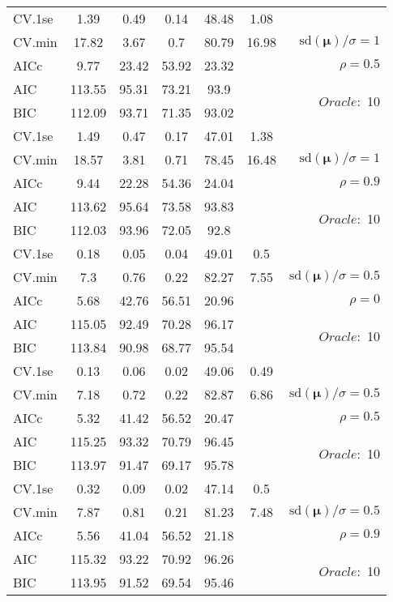 \begin{table}
\begin{center}
\begin{tabular}{l*{5}{c}|r}
 \hline 
CV.1se & 1.39 & 0.49 & 0.14 & 48.48 & 1.08 & \\
CV.min & 17.82 & 3.67 & 0.7 & 80.79 & 16.98 &  $\mathrm{sd}(\mathbf{\mu})/\sigma=1$ \\
AICc & 9.77 & 23.42 & 53.92 & 23.32 & & $\rho=0.5$ \\
AIC & 113.55 & 95.31 & 73.21 & 93.9 & &  \multirow{2}{*}{$Oracle: $ 10} \\
BIC & 112.09 & 93.71 & 71.35 & 93.02 & &  \\
 \hline 
CV.1se & 1.49 & 0.47 & 0.17 & 47.01 & 1.38 & \\
CV.min & 18.57 & 3.81 & 0.71 & 78.45 & 16.48 &  $\mathrm{sd}(\mathbf{\mu})/\sigma=1$ \\
AICc & 9.44 & 22.28 & 54.36 & 24.04 & & $\rho=0.9$ \\
AIC & 113.62 & 95.64 & 73.58 & 93.83 & &  \multirow{2}{*}{$Oracle: $ 10} \\
BIC & 112.03 & 93.96 & 72.05 & 92.8 & &  \\
 \hline 
CV.1se & 0.18 & 0.05 & 0.04 & 49.01 & 0.5 & \\
CV.min & 7.3 & 0.76 & 0.22 & 82.27 & 7.55 &  $\mathrm{sd}(\mathbf{\mu})/\sigma=0.5$ \\
AICc & 5.68 & 42.76 & 56.51 & 20.96 & & $\rho=0$ \\
AIC & 115.05 & 92.49 & 70.28 & 96.17 & &  \multirow{2}{*}{$Oracle: $ 10} \\
BIC & 113.84 & 90.98 & 68.77 & 95.54 & &  \\
 \hline 
CV.1se & 0.13 & 0.06 & 0.02 & 49.06 & 0.49 & \\
CV.min & 7.18 & 0.72 & 0.22 & 82.87 & 6.86 &  $\mathrm{sd}(\mathbf{\mu})/\sigma=0.5$ \\
AICc & 5.32 & 41.42 & 56.52 & 20.47 & & $\rho=0.5$ \\
AIC & 115.25 & 93.32 & 70.79 & 96.45 & &  \multirow{2}{*}{$Oracle: $ 10} \\
BIC & 113.97 & 91.47 & 69.17 & 95.78 & &  \\
 \hline 
CV.1se & 0.32 & 0.09 & 0.02 & 47.14 & 0.5 & \\
CV.min & 7.87 & 0.81 & 0.21 & 81.23 & 7.48 &  $\mathrm{sd}(\mathbf{\mu})/\sigma=0.5$ \\
AICc & 5.56 & 41.04 & 56.52 & 21.18 & & $\rho=0.9$ \\
AIC & 115.32 & 93.22 & 70.92 & 96.26 & &  \multirow{2}{*}{$Oracle: $ 10} \\
BIC & 113.95 & 91.52 & 69.54 & 95.46 & &  \\
 \hline 
\end{tabular}
\end{center}
\vspace{-1cm}
\end{table}





